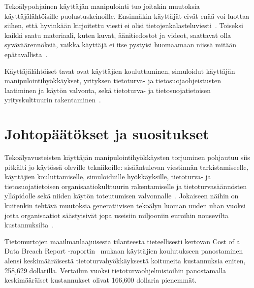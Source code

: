 \begin{otherlanguage}{finnish}
Tekoälypohjainen käyttäjän manipulointi tuo joitakin muutoksia käyttäjälähtöisille puolustuskeinoille. Ensinnäkin käyttäjät eivät enää voi luottaa siihen, että hyvinkään kirjoitettu viesti ei olisi tietojenkalasteluviesti~\citep{gupta_From_ChatGPT_to_ThreatGPT_2023}. Toiseksi kaikki saatu materiaali, kuten kuvat, äänitiedostot ja videot, saattavat olla syväväärennöksiä, vaikka käyttäjä ei itse pystyisi huomaamaan niissä mitään epätavallista~\citep{blauth_AI_Crime_Overview_Malicious_Use_Abuse_2022}.



Käyttäjälähtöiset tavat ovat käyttäjien kouluttaminen, simuloidut käyttäjän manipulointihyökkäykset, yrityksen tietoturva- ja tietosuojaohjeistusten laatiminen ja käytön valvonta, sekä tietoturva- ja tietosuojatietoisen yrityskulttuurin rakentaminen~\citep{tsinganos_Towards_Automated_Recognition_Chat_SE_Enterprise_2018}.




\section*{Johtopäätökset ja suositukset}

Tekoälyavusteisten käyttäjän manipulointihyökkäysten torjuminen pohjautuu siis pitkälti jo käytössä oleville tekniikoille: sisääntulevan viestinnän tarkistamiseelle, käyttäjien kouluttamiselle, simuloiduille hyökkäyksille, tietoturva- ja tietosuojatietoisen organisaatiokulttuurin rakentamiselle ja tietoturvasäännösten ylläpidolle sekä niiden käytön toteutumisen valvonnalle~\citep{fakhouri_AI_Driven_Solutions_SE_Attacks_2024}. Jokaiseen näihin on kuitenkin tehtävä muutoksia generatiivisen tekoälyn luoman uuden uhan vuoksi jotta organisaatiot säästyisivät jopa useisiin miljooniin euroihin nousevilta kustannuksilta~\citep{eniza_Threat_Landscape_2024, verizon_Data_Breach_Investigations_Report_2024}.

Tietomurtojen maailmanlaajuisesta tilanteesta tieteellisesti kertovan Cost of a Data Breach Report -raportin~\citep{ibm_Cost_Data_Breach_Report_2024} mukaan käyttäjien koulutukseen panostaminen alensi keskimääräisestä tietoturvahyökkäyksestä koituneita kustannuksia eniten, 258,629 dollarilla. Vertailun vuoksi tietoturvaohjelmistoihin panostamalla keskimääräiset kustannukset olivat 166,600 dollaria pienemmät.




\end{otherlanguage}
